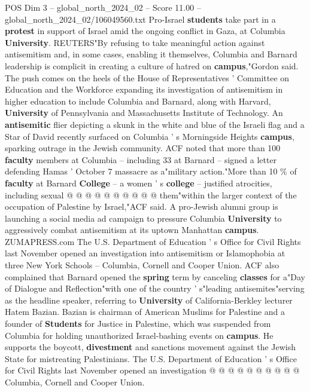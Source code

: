 \begin{textsample}{POS Dim 3 – global\_north\_2024\_02 – Score 11.00 – global\_north\_2024\_02/106049560.txt}  \label{ex:f3_pos_252}
Pro-Israel \textbf{students} take part in a \textbf{protest} in support of Israel amid the ongoing conflict in Gaza, at Columbia \textbf{University}.
REUTERS"By refusing to take meaningful action against antisemitism and, in some cases, enabling it themselves, Columbia and Barnard leadership is complicit in creating a culture of hatred on \textbf{campus},"Gordon said.
The push comes on the heels of the House of Representatives ' Committee on Education and the Workforce expanding its investigation of antisemitism in higher education to include Columbia and Barnard, along with Harvard, \textbf{University} of Pennsylvania and Massachusetts Institute of Technology.
An \textbf{antisemitic} flier depicting a skunk in the white and blue of the Israeli flag and a Star of David recently surfaced on Columbia ' s Morningside Heights \textbf{campus}, sparking outrage in the Jewish community.
ACF noted that more than 100 \textbf{faculty} members at Columbia -- including 33 at Barnard -- signed a letter defending Hamas ' October 7 massacre as a"military action."More than 10 \% of \textbf{faculty} at Barnard \textbf{College} -- a women ' s \textbf{college} -- justified atrocities, including sexual @ @ @ @ @ @ @ @ @ @ them"within the larger context of the occupation of Palestine by Israel,"ACF said.
A pro-Jewish alumni group is launching a social media ad campaign to pressure Columbia \textbf{University} to aggressively combat antisemitism at its uptown Manhattan \textbf{campus}.
ZUMAPRESS.com The U.S.
Department of Education ' s Office for Civil Rights last November opened an investigation into antisemitism or Islamophobia at three New York Schools -- Columbia, Cornell and Cooper Union.
ACF also complained that Barnard opened the \textbf{spring} term by canceling \textbf{classes} for a"Day of Dialogue and Reflection"with one of the country ' s"leading antisemites"serving as the headline speaker, referring to \textbf{University} of California-Berkley lecturer Hatem Bazian.
Bazian is chairman of American Muslims for Palestine and a founder of \textbf{Students} for Justice in Palestine, which was suspended from Columbia for holding unauthorized Israel-bashing events on \textbf{campus}.
He supports the boycott, \textbf{divestment} and sanctions movement against the Jewish State for mistreating Palestinians.
The U.S.
Department of Education ' s Office for Civil Rights last November opened an investigation @ @ @ @ @ @ @ @ @ @ Columbia, Cornell and Cooper Union.

\end{textsample}
